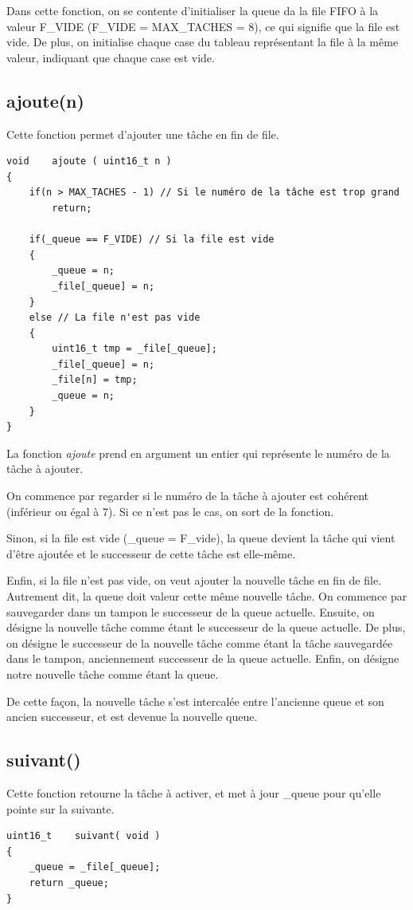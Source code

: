 \documentclass[a4paper,12pt]{report}
\begin{document}
Dans cette fonction, on se contente d'initialiser la queue da la file FIFO à la valeur F\_VIDE (F\_VIDE = MAX\_TACHES = 8), ce qui signifie que la file est vide. De plus, on initialise chaque case du tableau représentant la file à la même valeur, indiquant que chaque case est vide.


\subsection{ajoute(n)}
Cette fonction permet d'ajouter une tâche en fin de file.
\begin{lstlisting}
void	ajoute ( uint16_t n )
{
	if(n > MAX_TACHES - 1) // Si le numéro de la tâche est trop grand
		return;

	if(_queue == F_VIDE) // Si la file est vide
	{
		_queue = n;
		_file[_queue] = n;
	}
	else // La file n'est pas vide
	{
		uint16_t tmp = _file[_queue];
		_file[_queue] = n;
		_file[n] = tmp;
		_queue = n;
	}
}
\end{lstlisting}

La fonction \textit{ajoute} prend en argument un entier qui représente le numéro de la tâche à ajouter.\smallbreak

On commence par regarder si le numéro de la tâche à ajouter est cohérent (inférieur ou égal à 7). Si ce n'est pas le cas, on sort de la fonction.\smallbreak

Sinon, si la file est vide (\_queue = F\_vide), la queue devient la tâche qui vient d'être ajoutée et le successeur de cette tâche est elle-même.\smallbreak

Enfin, si la file n'est pas vide, on veut ajouter la nouvelle tâche en fin de file. Autrement dit, la queue doit valeur cette même nouvelle tâche. On commence par sauvegarder dans un tampon le successeur de la queue actuelle. Ensuite, on désigne la nouvelle tâche comme étant le successeur de la queue actuelle. De plus, on désigne le successeur de la nouvelle tâche comme étant la tâche sauvegardée dans le tampon, anciennement successeur de la queue actuelle. Enfin, on désigne notre nouvelle tâche comme étant la queue.\smallbreak

De cette façon, la nouvelle tâche s'est intercalée entre l'ancienne queue et son ancien successeur, et est devenue la nouvelle queue.


\subsection{suivant()}
Cette fonction retourne la tâche à activer, et met à jour \_queue pour qu'elle pointe sur la suivante.
\begin{lstlisting}
uint16_t	suivant( void )
{
	_queue = _file[_queue];
	return _queue;
}
\end{lstlisting}
\end{document}
